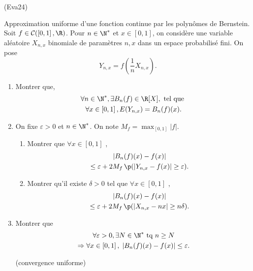 \begin{tiny}(Eva24)\end{tiny} Approximation uniforme d'une fonction continue par les polynômes de Bernstein.\newline
Soit $f\in \mathcal{C}(\left[ 0,1\right],\R)$. Pour $n\in \N^*$ et $x\in \left[ 0,1\right]$, on considère une variable aléatoire $X_{n,x}$ binomiale de paramètres $n,x$ dans un espace probabilisé fini. On pose
\[
 Y_{n,x} = f(\frac{1}{n}X_{n,x}).
\]
\begin{enumerate}
 \item Montrer que,
\begin{multline*}
\forall n\in \N^*, \exists B_n(f) \in \R[X], \text{ tel que }\\ \forall x \in \left[ 0,1\right] , E(Y_{n,x}) = B_n(f)(x).
\end{multline*}

 \item On fixe $\varepsilon >0$ et $n \in \N^*$. On note $M_f = \max_{\left[ 0,1\right] }|f|$.
\begin{enumerate}
 \item Montrer que $\forall x \in \left[ 0,1\right]$ ,
\begin{multline*}
 \left| B_n(f)(x) -f(x)\right| \\ \leq \varepsilon 
 + 2 M_f\, \p(\left| Y_{n,x} - f(x)\right| \geq \varepsilon).
\end{multline*}

\item Montrer qu'il existe $\delta >0$ tel que $\forall x \in \left[ 0,1\right]$ ,
\begin{multline*}
 \left| B_n(f)(x) -f(x)\right| \\ \leq \varepsilon 
 + 2 M_f\, \p(\left| X_{n,x} - nx\right| \geq n \delta).
\end{multline*}

\end{enumerate}
\item Montrer que
\begin{multline*}
 \forall \varepsilon >0, \exists N \in \N^* \text{ tq }
 n \geq N \\
 \Rightarrow \forall x \in \left[ 0,1 \right] ,\;
 \left|B_{n}(f)(x) - f(x)\right| \leq \varepsilon.
\end{multline*}

(convergence uniforme)
\end{enumerate}
